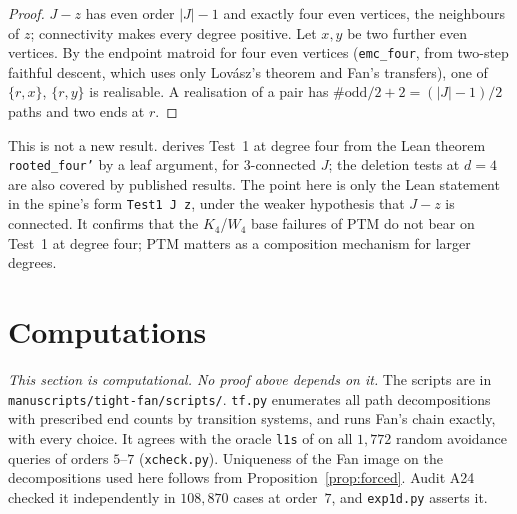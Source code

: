 \documentclass[11pt]{amsart}
\theoremstyle{definition}
\begin{document}
\begin{proof}
$J-z$ has even order $|J|-1$ and exactly four even vertices, the neighbours of $z$; connectivity makes
every degree positive. Let $x,y$ be two further even vertices. By the endpoint matroid for four even
vertices (\texttt{emc\_four}, from two-step faithful descent, which uses only Lov\'asz's theorem and
Fan's transfers), one of $\{r,x\}$, $\{r,y\}$ is realisable. A realisation of a pair has
$\#\mathrm{odd}/2+2=(|J|-1)/2$ paths and two ends at $r$.
\end{proof}

This is not a new result. \cite[Remark~7.3]{TM} derives Test~1 at degree four from the Lean theorem
\texttt{rooted\_four'} by a leaf argument, for $3$-connected $J$; the deletion tests at $d=4$ are also
covered by published results. The point here is only the Lean statement in the spine's form
\texttt{Test1 J z}, under the weaker hypothesis that $J-z$ is connected. It confirms that the
$K_4$/$W_4$ base failures of PTM do not bear on Test~1 at degree four; PTM matters as a composition
mechanism for larger degrees.

\section{Computations}\label{sec:comp}

\emph{This section is computational. No proof above depends on it.} The scripts are in
\nolinkurl{manuscripts/tight-fan/scripts/}. \texttt{tf.py} enumerates all path decompositions with
prescribed end counts by transition systems, and runs Fan's chain exactly, with every choice. It
agrees with the oracle \texttt{l1s} of \cite{L1S} on all $1{,}772$ random avoidance queries of
orders $5$--$7$ (\texttt{xcheck.py}). Uniqueness of the Fan image on the decompositions used here
follows from Proposition~\ref{prop:forced}. Audit A24 checked it independently in $108{,}870$ cases
at order~$7$, and \texttt{exp1d.py} asserts it.
\end{document}
